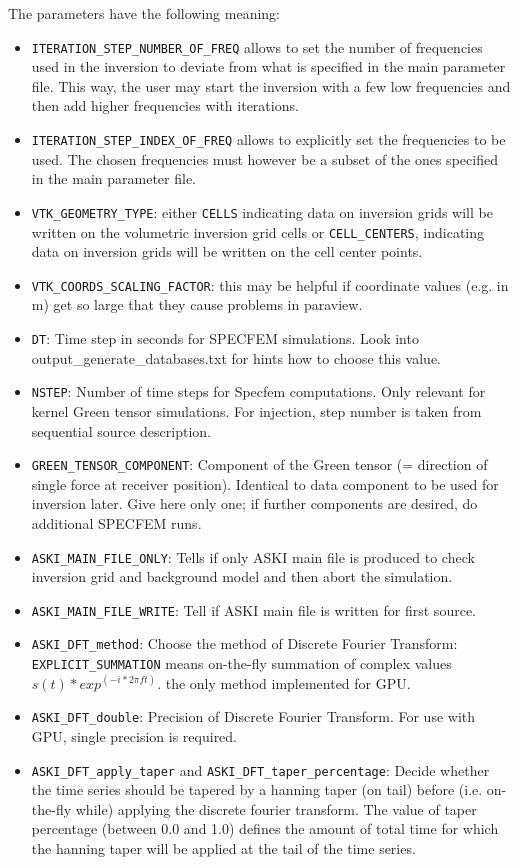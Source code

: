 %
The parameters have the following meaning:
\begin{itemize}
	\setlength{\itemsep}{-0.1cm}
   \item \verb+ITERATION_STEP_NUMBER_OF_FREQ+ allows to set the number of frequencies used in the inversion to deviate from what is specified in the main parameter file. This way, the user may start the inversion with a few low frequencies and then add higher frequencies with iterations.
   \item \verb+ITERATION_STEP_INDEX_OF_FREQ+ allows to explicitly set the frequencies to be used. The chosen frequencies must however be a subset of the ones specified in the main parameter file.
   \item \verb+VTK_GEOMETRY_TYPE+: either \verb+CELLS+ indicating data on inversion grids will be written on the volumetric inversion grid cells or
    \verb+CELL_CENTERS+, indicating data on inversion grids will be written on the cell center points.
   \item \verb+VTK_COORDS_SCALING_FACTOR+: this may be helpful if coordinate values (e.g. in m) get so large that they cause problems in paraview.
   \item \verb+DT+: Time step in seconds for SPECFEM simulations. Look into output\_generate\_databases.txt for hints how to choose this value.
   \item \verb+NSTEP+: Number of time steps for Specfem computations. Only relevant for kernel Green tensor simulations. For injection, step number is taken from sequential source description.
   \item \verb+GREEN_TENSOR_COMPONENT+:  Component of the Green tensor (= direction of single force at receiver position). Identical to data component to be used for inversion later.  Give here only one; if further components are desired, do additional SPECFEM runs.
   \item \verb+ASKI_MAIN_FILE_ONLY+:  Tells if only ASKI main file is produced to check inversion grid and background model and then abort the simulation.
   \item \verb+ASKI_MAIN_FILE_WRITE+:  Tell if ASKI main file is written for first source.
   \item \verb+ASKI_DFT_method+: Choose the method of Discrete Fourier Transform: \\
   \verb+EXPLICIT_SUMMATION+ means on-the-fly summation of complex values $s(t)*exp^(-i*2\pi ft)$. the only method implemented for GPU.
   \item \verb+ASKI_DFT_double+:  Precision of Discrete Fourier Transform. For use with GPU, single precision is required.
   \item \verb+ASKI_DFT_apply_taper+ and \verb+ASKI_DFT_taper_percentage+:  Decide whether the time series should be tapered by a hanning taper (on tail) before (i.e. on-the-fly while) applying the discrete fourier transform. The value of taper percentage (between 0.0 and 1.0) defines the amount of  total time for which the hanning taper will be applied at the tail of the time series.
\end{itemize}
